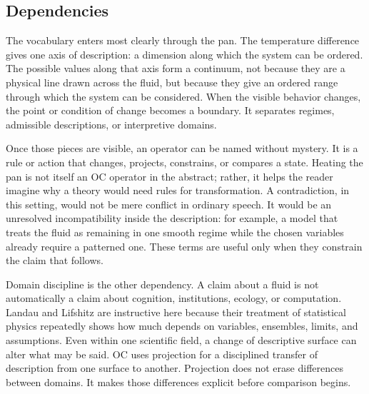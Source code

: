 \documentclass[11pt,a4paper,openany]{book}
\begin{document}
\subsection{Dependencies}
The vocabulary enters most clearly through the pan. The temperature difference gives one axis of description: a dimension along which the system can be ordered. The possible values along that axis form a continuum, not because they are a physical line drawn across the fluid, but because they give an ordered range through which the system can be considered. When the visible behavior changes, the point or condition of change becomes a boundary. It separates regimes, admissible descriptions, or interpretive domains. \cite{goldenfeld_lectures,kadanoff_scaling}\par
Once those pieces are visible, an operator can be named without mystery. It is a rule or action that changes, projects, constrains, or compares a state. Heating the pan is not itself an OC operator in the abstract; rather, it helps the reader imagine why a theory would need rules for transformation. A contradiction, in this setting, would not be mere conflict in ordinary speech. It would be an unresolved incompatibility inside the description: for example, a model that treats the fluid as remaining in one smooth regime while the chosen variables already require a patterned one. These terms are useful only when they constrain the claim that follows.\par
Domain discipline is the other dependency. A claim about a fluid is not automatically a claim about cognition, institutions, ecology, or computation. Landau and Lifshitz are instructive here because their treatment of statistical physics repeatedly shows how much depends on variables, ensembles, limits, and assumptions. Even within one scientific field, a change of descriptive surface can alter what may be said. OC uses projection for a disciplined transfer of description from one surface to another. Projection does not erase differences between domains. It makes those differences explicit before comparison begins.\par
\end{document}

